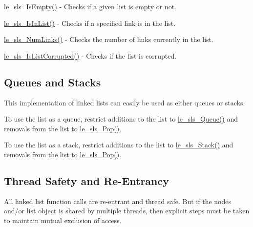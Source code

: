 \begin{DoxyItemize}
\item \hyperlink{le__singly_linked_list_8h_a8f59b1a42d967d018e301f7b7f2d55ae}{le\+\_\+sls\+\_\+\+Is\+Empty()} -\/ Checks if a given list is empty or not.
\item \hyperlink{le__singly_linked_list_8h_a253a443ee79c169462f64551b40f2dd7}{le\+\_\+sls\+\_\+\+Is\+In\+List()} -\/ Checks if a specified link is in the list.
\item \hyperlink{le__singly_linked_list_8h_a33feea925d3a247531c4796aba93f6fa}{le\+\_\+sls\+\_\+\+Num\+Links()} -\/ Checks the number of links currently in the list.
\item \hyperlink{le__singly_linked_list_8h_a871361a091418784f524090d5515a98f}{le\+\_\+sls\+\_\+\+Is\+List\+Corrupted()} -\/ Checks if the list is corrupted.
\end{DoxyItemize}\hypertarget{c_singly_linked_list_sls_fifo}{}\subsection{Queues and Stacks}\label{c_singly_linked_list_sls_fifo}
This implementation of linked lists can easily be used as either queues or stacks.

To use the list as a queue, restrict additions to the list to {\ttfamily \hyperlink{le__singly_linked_list_8h_afb5e8ffc3fb5c0d86eb47d0885a6f546}{le\+\_\+sls\+\_\+\+Queue()}} and removals from the list to {\ttfamily \hyperlink{le__singly_linked_list_8h_a85f5132147870e260b3b142665ec587e}{le\+\_\+sls\+\_\+\+Pop()}}.

To use the list as a stack, restrict additions to the list to {\ttfamily \hyperlink{le__singly_linked_list_8h_aca4266a87d4c5e3dca130cd5d48b99af}{le\+\_\+sls\+\_\+\+Stack()}} and removals from the list to {\ttfamily \hyperlink{le__singly_linked_list_8h_a85f5132147870e260b3b142665ec587e}{le\+\_\+sls\+\_\+\+Pop()}}.\hypertarget{c_singly_linked_list_sls_synch}{}\subsection{Thread Safety and Re-\/\+Entrancy}\label{c_singly_linked_list_sls_synch}
All linked list function calls are re-\/entrant and thread safe. But if the nodes and/or list object is shared by multiple threads, then explicit steps must be taken to maintain mutual exclusion of access.





